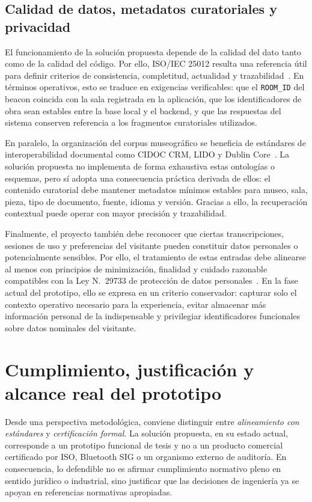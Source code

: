 \subsection{Calidad de datos, metadatos curatoriales y privacidad}

El funcionamiento de la solución propuesta depende de la calidad del dato tanto como de la calidad del código. Por ello, ISO/IEC 25012 resulta una referencia útil para definir criterios de consistencia, completitud, actualidad y trazabilidad~\cite{iso25012}. En términos operativos, esto se traduce en exigencias verificables: que el \texttt{ROOM\_ID} del beacon coincida con la sala registrada en la aplicación, que los identificadores de obra sean estables entre la base local y el backend, y que las respuestas del sistema conserven referencia a los fragmentos curatoriales utilizados.

En paralelo, la organización del corpus museográfico se beneficia de estándares de interoperabilidad documental como CIDOC CRM, LIDO y Dublin Core~\cite{cidoccrm,lido,dublincore}. La solución propuesta no implementa de forma exhaustiva estas ontologías o esquemas, pero sí adopta una consecuencia práctica derivada de ellos: el contenido curatorial debe mantener metadatos mínimos estables para museo, sala, pieza, tipo de documento, fuente, idioma y versión. Gracias a ello, la recuperación contextual puede operar con mayor precisión y trazabilidad.

Finalmente, el proyecto también debe reconocer que ciertas transcripciones, sesiones de uso y preferencias del visitante pueden constituir datos personales o potencialmente sensibles. Por ello, el tratamiento de estas entradas debe alinearse al menos con principios de minimización, finalidad y cuidado razonable compatibles con la Ley N.\ 29733 de protección de datos personales~\cite{ley29733}. En la fase actual del prototipo, ello se expresa en un criterio conservador: capturar solo el contexto operativo necesario para la experiencia, evitar almacenar más información personal de la indispensable y privilegiar identificadores funcionales sobre datos nominales del visitante.

\section{Cumplimiento, justificación y alcance real del prototipo}

Desde una perspectiva metodológica, conviene distinguir entre \textit{alineamiento con estándares} y \textit{certificación formal}. La solución propuesta, en su estado actual, corresponde a un prototipo funcional de tesis y no a un producto comercial certificado por ISO, Bluetooth SIG o un organismo externo de auditoría. En consecuencia, lo defendible no es afirmar cumplimiento normativo pleno en sentido jurídico o industrial, sino justificar que las decisiones de ingeniería ya se apoyan en referencias normativas apropiadas.

